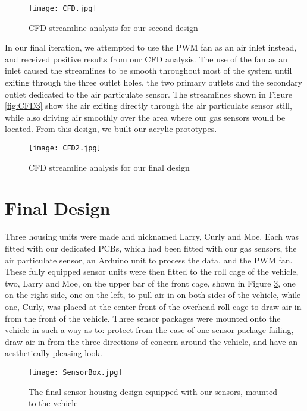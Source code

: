 \begin{figure}[H]
	\centering
	\texttt{[image: CFD.jpg]}
	\caption{CFD streamline analysis for our second design}
	\label{fig:CFD2}
\end{figure}

In our final iteration, we attempted to use the PWM fan as an air inlet instead, and received positive results from our CFD analysis. The use of the fan as an inlet caused the streamlines to be smooth throughout most of the system until exiting through the three outlet holes, the two primary outlets and the secondary outlet dedicated to the air particulate sensor. The streamlines shown in Figure \ref{fig:CFD3} show the air exiting directly through the air particulate sensor still, while also driving air smoothly over the area where our gas sensors would be located. From this design, we built our acrylic prototypes. 

\begin{figure}[H]
	\centering
	\texttt{[image: CFD2.jpg]}
	\caption{CFD streamline analysis for our final design}
	\label{fig:CFD}
\end{figure}

\section{Final Design}
Three housing units were made and nicknamed Larry, Curly and Moe. Each was fitted with our dedicated PCBs, which had been fitted with our gas sensors, the air particulate sensor, an Arduino unit to process the data, and the PWM fan. These fully equipped sensor units were then fitted to the roll cage of the vehicle, two, Larry and Moe, on the upper bar of the front cage, shown in Figure \ref{fig:Box}, one on the right side, one on the left, to pull air in on both sides of the vehicle, while one, Curly, was placed at the center-front of the overhead roll cage to draw air in from the front of the vehicle. Three sensor packages were mounted onto the vehicle in such a way as to: protect from the case of one sensor package failing, draw air in from the three directions of concern around the vehicle, and have an aesthetically pleasing look.

\begin{figure}[H]
	\centering
	\texttt{[image: SensorBox.jpg]}
	\caption{The final sensor housing design equipped with our sensors, mounted to the vehicle}
	\label{fig:Box}
\end{figure}

